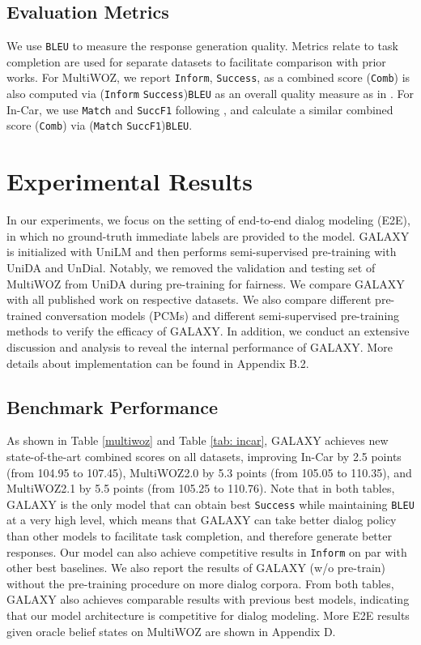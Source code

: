\documentclass[letterpaper]{article} \usepackage{aaai22}  \usepackage{times}  \usepackage{helvet}  \usepackage{courier}  \usepackage[hyphens]{url}  \usepackage{graphicx} \urlstyle{rm} \def\UrlFont{\rm}  \usepackage{natbib}  \usepackage{caption} \DeclareCaptionStyle{ruled}{labelfont=normalfont,labelsep=colon,strut=off} \frenchspacing  \setlength{\pdfpagewidth}{8.5in}  \setlength{\pdfpageheight}{11in}  \usepackage{algorithm}
\begin{document}
\subsection{Evaluation Metrics}
We use \texttt{BLEU} \cite{papineni2002bleu} to measure the response generation quality. Metrics relate to task completion are used for separate datasets to facilitate comparison
with prior works. For MultiWOZ, we report \texttt{Inform}, \texttt{Success},  
as a combined score (\texttt{Comb}) is also computed via (\texttt{Inform}  \texttt{Success})\texttt{BLEU}
as an overall quality measure 
as in \citet{mehri2019structured}. For In-Car, we use \texttt{Match} and \texttt{SuccF1} following \citet{lei2018sequicity}, and calculate a similar combined score (\texttt{Comb}) via (\texttt{Match}  \texttt{SuccF1})\texttt{BLEU}.







\section{Experimental Results}

In our experiments, we focus on the setting of end-to-end dialog modeling (E2E), in which no ground-truth immediate labels are provided to the model. GALAXY is initialized with UniLM and then performs semi-supervised pre-training with UniDA and UnDial. Notably, we removed the validation and testing set of MultiWOZ from UniDA during pre-training for fairness. We compare GALAXY with all published work on respective datasets. We also compare different pre-trained conversation models (PCMs) and different semi-supervised pre-training methods to verify the efficacy of GALAXY. In addition, we conduct an extensive discussion and analysis to reveal the internal performance of GALAXY. More details about implementation can be found in Appendix B.2.

\subsection{Benchmark Performance}
As shown in Table \ref{multiwoz} and Table \ref{tab: incar}, GALAXY achieves new state-of-the-art combined scores on all datasets, improving In-Car by 2.5 points (from 104.95 to 107.45), MultiWOZ2.0 by 5.3 points (from 105.05 to 110.35), and MultiWOZ2.1 by 5.5 points (from  105.25 to 110.76).
Note that in both tables, GALAXY is the only model that can obtain best \texttt{Success} while maintaining \texttt{BLEU} at a very high level, which means that GALAXY can take better dialog policy than other models to facilitate task completion, and therefore generate better responses. Our model can also achieve competitive results in \texttt{Inform} on par with other best baselines.
We also report the results of GALAXY (w/o pre-train) without the pre-training procedure on more dialog corpora. From both tables, GALAXY also achieves comparable results with previous best models, indicating that our model architecture is competitive for dialog modeling. More E2E results given oracle belief states on MultiWOZ are shown in Appendix D.
\end{document}
